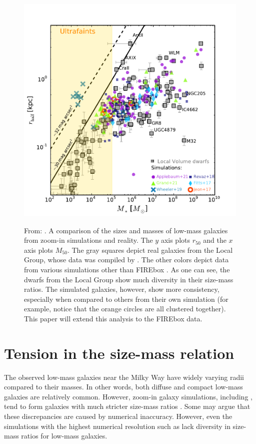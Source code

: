 \begin{figure}
    \centering
    \includegraphics*[width=\textwidth*2/3]{figs/sales/fig4.pdf}
    \label{fig:sales-size-mass}
    \caption{
        From: \cite{salesBaryonicSolutionsChallenges2022}. A comparison of the sizes and masses of low-mass galaxies from zoom-in simulations and reality. The $y$ axis plots $r_{50}$ and the $x$ axis plots $M_{50}$. The gray squares depict real galaxies from the Local Group, whose data was compiled by \cite{mcconnachieOBSERVEDPROPERTIESDWARF2012}. The other colors depict data from various simulations other than FIREbox \citep[refer to][]{salesBaryonicSolutionsChallenges2022}. As one can see, the dwarfs from the Local Group show much diversity in their size-mass ratios. The simulated galaxies, however, show more consistency, especially when compared to others from their own simulation (for example, notice that the orange circles are all clustered together). This paper will extend this analysis to the FIREbox data.
    }
\end{figure}


\section{Tension in the size-mass relation}

The observed low-mass galaxies near the Milky Way have widely varying radii compared to their masses. In other words, both diffuse and compact low-mass galaxies are relatively common. However, zoom-in galaxy simulations, including \cite{fittsFireFieldSimulating2017}, tend to form galaxies with much stricter size-mass ratios \citep{salesBaryonicSolutionsChallenges2022}. Some may argue that these discrepancies are caused by numerical inaccuracy. However, even the simulations with the highest numerical resolution such as \cite{wheelerBeItTherefore2019} lack diversity in size-mass ratios for low-mass galaxies. 

